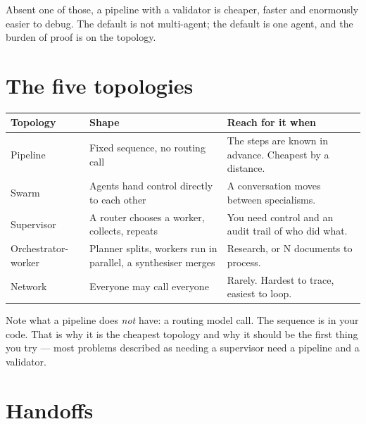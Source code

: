 Absent one of those, a pipeline with a validator is cheaper, faster and
enormously easier to debug. The default is not multi-agent; the default is one
agent, and the burden of proof is on the topology.

\section{The five topologies}
\label{sec:topologies}


\begin{center}
\small
\begin{tabularx}{\linewidth}{@{}lXX@{}}
\toprule
\textbf{Topology} & \textbf{Shape} & \textbf{Reach for it when} \\
\midrule
Pipeline & Fixed sequence, no routing call & The steps are known in advance.
  Cheapest by a distance. \\[3pt]
Swarm & Agents hand control directly to each other & A conversation moves
  between specialisms. \\[3pt]
Supervisor & A router chooses a worker, collects, repeats & You need control and
  an audit trail of who did what. \\[3pt]
Orchestrator-worker & Planner splits, workers run in parallel, a synthesiser
  merges & Research, or N documents to process. \\[3pt]
Network & Everyone may call everyone & Rarely. Hardest to trace, easiest to
  loop. \\
\bottomrule
\end{tabularx}
\end{center}

\begin{note}
Note what a pipeline does \emph{not} have: a routing model call. The sequence is
in your code. That is why it is the cheapest topology and why it should be the
first thing you try --- most problems described as needing a supervisor need a
pipeline and a validator.
\end{note}

\section{Handoffs}
\label{sec:handoffs}

